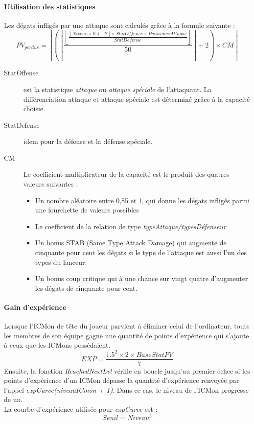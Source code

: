 \documentclass[12pt,a4paper, twoside]{article}
\begin{document}
        \paragraph{Utilisation des statistiques} Les dégats infligés par une attaque sont calculés grâce à la formule suivante :
        \begin{equation}
            \displaystyle{  PV_{perdus} = \left \lfloor \left(\left\lfloor\frac{\left\lfloor\frac{\left\lfloor Niveau \times 0.4 +2 \right\rfloor \times StatOffense \times PuissanceAttaque}{StatDefense}\right\rfloor}{50} \right\rfloor +2 \right) \times CM \right \rfloor  }
        \end{equation}
        \begin{description}
        \item[StatOffense]{est la statistique \emph{attaque} ou \emph{attaque spéciale} de l'attaquant. La différenciation attaque et attaque spéciale est déterminé grâce à la capacité choisie.}
        \item[StatDefense]{idem pour la défense et la défense spéciale.}
        \item[CM]{Le coefficient multiplicateur de la capacité est le produit des quatres valeurs suivantes :\\
            \begin{itemize}
                \item Un nombre aléatoire entre 0,85 et 1, qui donne les dégats infligés parmi une fourchette de valeurs possibles
                \item Le coefficient de la relation de type \emph{typeAttaque/typesDéfenseur}
                \item Un bonus STAB (Same Type Attack Damage) qui augmente de cinquante pour cent les dégats si le type de l'attaque est aussi l'un des types du lanceur.
                \item Un bonus coup critique qui à une chance sur vingt quatre d'augmenter les dégats de cinquante pour cent.
            \end{itemize}
        }
        \end{description}
        \paragraph{Gain d'expérience} Lorsque l'ICMon de tête du joueur parvient à éliminer celui de l'ordinateur, touts les membres de son équipe gagne une quantité de points d'expérience qui s'ajoute à ceux que les ICMons possédaient.
        \begin{equation}
            \displaystyle{ EXP = \dfrac {1.5 ^ 2 \times 2 \times BaseStatPV}{7} }
        \end{equation}
        Ensuite, la fonction \emph{ReachedNextLvl} vérifie en boucle jusqu'au premier échec si les points d'expérience d'un ICMon dépasse la quantité d'expérience renvoyée par l'appel \emph{expCurve(niveauICmon + 1)}. Dans ce cas, le niveau de l'ICMon progresse de un.\\
        La courbe d'expérience utilisée pour \emph{expCurve} est :
        \begin{equation}
            \displaystyle{ Seuil = Niveau ^ 3}
        \end{equation}
\newpage
\end{document}
